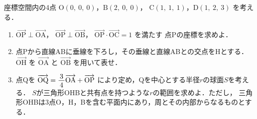 ﻿\documentclass[../../../uem_mat_tok_q.tex]{subfiles}
\begin{document}
    座標空間内の4点 $\mathrm{O}(0,\:0,\:0)$，$\mathrm{B}(2,\:0,\:0)$，%
    $\mathrm{C}(1,\:1,\:1)$，$\mathrm{D}(1,\:2,\:3)$ を考える．

    \begin{enumerate}
        \item $\overrightarrow{\mathrm{OP}}\perp\overrightarrow{\mathrm{OA}}$，%
            $\overrightarrow{\mathrm{OP}}\perp\overrightarrow{\mathrm{OB}}$，%
            $\overrightarrow{\mathrm{OP}}\cdot\overrightarrow{\mathrm{OC}}=1$ を満たす%
            点Pの座標を求めよ．
        \item 点Pから直線ABに垂線を下ろし，その垂線と直線ABとの交点をHとする．%
            $\overrightarrow{\mathrm{OH}}$ を $\overrightarrow{\mathrm{OA}}$ と %
            $\overrightarrow{\mathrm{OB}}$ を用いて表せ．
        \item 点Qを $\overrightarrow{\mathrm{OQ}}=\myfraca{3}{4}\overrightarrow{\mathrm{OA}}%
            +\overrightarrow{\mathrm{OP}}$ により定め，Qを中心とする半径$r$の球面$S$を考える．%
            $S$が三角形OHBと共有点を持つような$r$の範囲を求めよ．ただし，%
            三角形OHBは3点O，H，Bを含む平面内にあり，周とその内部からなるものとする．
    \end{enumerate}
\end{document}
